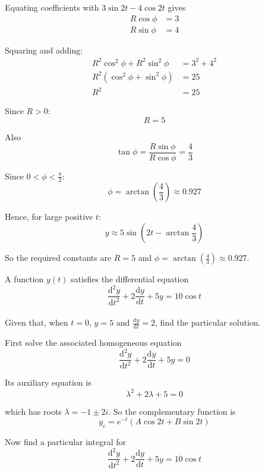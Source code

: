 \documentclass[leqno]{article}
\begin{document}
\begin{enumerate}[
  label=\textbf{\arabic*.},
  leftmargin=*,
  topsep=0pt,
  partopsep=0pt,
  parsep=0pt
]
\begin{djsSolution}
\begin{enumerate}[label=\textbf{(\alph*)}]
  Equating coefficients with $3\sin 2t-4\cos 2t$ gives
  \begin{align*}
  R\cos\phi&=3 \\
  R\sin\phi&=4
  \end{align*}

  Squaring and adding:
  \begin{align*}
  R^2\cos^2\phi+R^2\sin^2\phi&=3^2+4^2 \\
  R^2(\cos^2\phi+\sin^2\phi)&=25 \\
  R^2&=25
  \end{align*}

  Since $R>0$:
  \[
  R=5
  \]

  Also
  \[
  \tan\phi=\frac{R\sin\phi}{R\cos\phi}=\frac{4}{3}
  \]

  Since $0<\phi<\frac{\pi}{2}$:
  \[
  \phi=\arctan\left(\frac{4}{3}\right)\approx 0.927
  \]

  Hence, for large positive $t$:
  \[
  y\approx 5\sin\left(2t-\arctan\frac{4}{3}\right)
  \]

  So the required constants are $R=5$ and $\phi=\arctan\left(\frac{4}{3}\right)\approx 0.927$.
\end{enumerate}
\end{djsSolution}


\newpage

\questionitem

A function $y(t)$ satisfies the differential equation \\
\[
\frac{\mathrm{d}^2 y}{\mathrm{d}t^2}+2\frac{\mathrm{d}y}{\mathrm{d}t}+5y=10\cos t
\] \\
Given that, when $t=0$, $y=5$ and $\frac{\mathrm{d}y}{\mathrm{d}t}=2$, find the particular solution. 

\vspace*{10pt}

\begin{djsSolution}
First solve the associated homogeneous equation
\[
\frac{\mathrm{d}^2 y}{\mathrm{d} t^2}+2\frac{\mathrm{d} y}{\mathrm{d} t}+5y=0
\]

Its auxiliary equation is
\[
\lambda^2+2\lambda+5=0
\]

which has roots $\lambda=-1\pm 2i$. So the complementary function is
\[
y_c=e^{-t}(A\cos 2t+B\sin 2t)
\]

Now find a particular integral for
\[
\frac{\mathrm{d}^2 y}{\mathrm{d} t^2}+2\frac{\mathrm{d} y}{\mathrm{d} t}+5y=10\cos t
\]


\end{djsSolution}
\end{enumerate}
\end{document}

